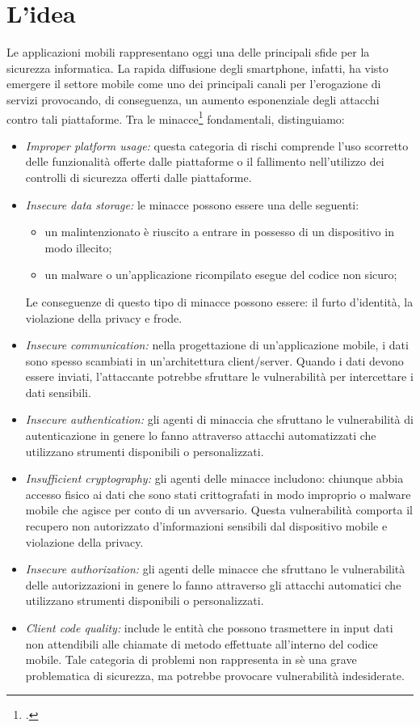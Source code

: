 \section{L'idea}\label{sec:l'idea}
Le applicazioni mobili rappresentano oggi una delle principali sfide per la sicurezza informatica.
La rapida diffusione degli smartphone, infatti, ha visto emergere il settore mobile come uno dei principali canali per l'erogazione di servizi provocando, di conseguenza, un aumento esponenziale degli attacchi contro tali piattaforme.
Tra le minacce\footcite{site:owasp} fondamentali, distinguiamo:

\begin{itemize}
    \item \textit{Improper platform usage:} questa categoria di rischi comprende l'uso scorretto delle funzionalità offerte dalle piattaforme o il fallimento nell'utilizzo dei controlli di sicurezza offerti dalle piattaforme.
    \item \textit{Insecure data storage:} le minacce possono essere una delle seguenti:
    \begin{itemize}
        \item un malintenzionato è riuscito a entrare in possesso di un dispositivo in modo illecito;
        \item un malware o un'applicazione ricompilato esegue del codice non sicuro;
    \end{itemize}
    Le conseguenze di questo tipo di minacce possono essere: il furto d'identità, la violazione della privacy e frode.
    \item \textit{Insecure communication:}
    nella progettazione di un'applicazione mobile, i dati sono spesso scambiati in un'architettura client/server.
    Quando i dati devono essere inviati, l'attaccante potrebbe sfruttare le vulnerabilità per intercettare i dati sensibili.
    \item \textit{Insecure authentication:}
    gli agenti di minaccia che sfruttano le vulnerabilità di autenticazione in genere lo fanno attraverso attacchi automatizzati che utilizzano strumenti disponibili o personalizzati.
    \item \textit{Insufficient cryptography:} gli agenti delle minacce includono: chiunque abbia accesso fisico ai dati che sono stati crittografati in modo improprio o malware mobile che agisce per conto di un avversario.
    Questa vulnerabilità comporta il recupero non autorizzato d'informazioni sensibili dal dispositivo mobile e violazione della privacy.
    \item \textit{Insecure authorization:}
    gli agenti delle minacce che sfruttano le vulnerabilità delle autorizzazioni in genere lo fanno attraverso gli attacchi automatici che utilizzano strumenti disponibili o personalizzati.
    \item \textit{Client code quality:} include le entità che possono trasmettere in input dati non attendibili alle chiamate di metodo effettuate all'interno del codice mobile.
    Tale categoria di problemi non rappresenta in sè una grave problematica di sicurezza, ma potrebbe provocare vulnerabilità indesiderate.


\end{itemize}
